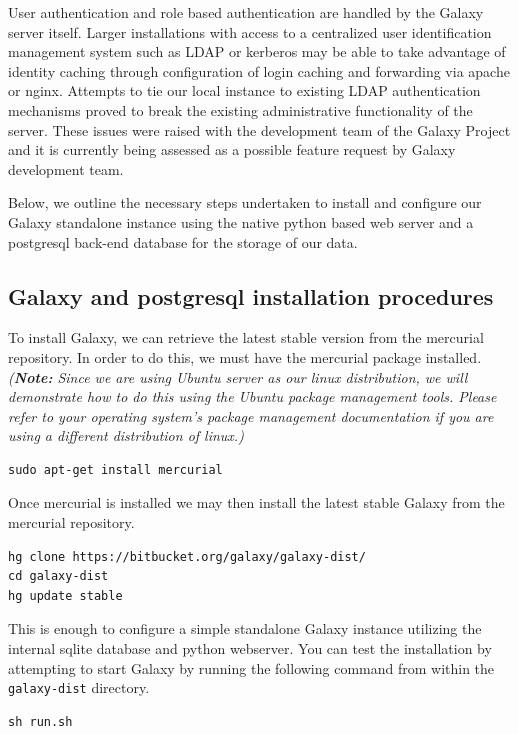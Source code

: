 \documentclass[a4paper,10pt]{article}
\begin{document}
User authentication and role based authentication are handled by the Galaxy server itself.  Larger installations with access to a centralized user identification management system such as LDAP or kerberos may be able to take advantage of identity caching through configuration of login caching and forwarding via apache or nginx.  Attempts to tie our local instance to existing LDAP authentication mechanisms proved to break the existing administrative functionality of the server.  These issues were raised with the development team of the Galaxy Project and it is currently being assessed as a possible feature request by Galaxy development team.

Below, we outline the necessary steps undertaken to install and configure our Galaxy standalone instance using the native python based web server and a postgresql back-end database for the storage of our data.
\subsection{Galaxy and postgresql installation procedures}
To install Galaxy, we can retrieve the latest stable version from the mercurial repository.  In order to do this, we must have the mercurial package installed.  \textit{(\textbf{Note:} Since we are using Ubuntu server as our linux distribution, we will demonstrate how to do this using the Ubuntu package management tools.  Please refer to your operating system's package management documentation if you are using a different distribution of linux.)}

\begin{lstlisting}
sudo apt-get install mercurial
\end{lstlisting}

Once mercurial is installed we may then install the latest stable Galaxy from the mercurial repository.

\begin{lstlisting}
hg clone https://bitbucket.org/galaxy/galaxy-dist/
cd galaxy-dist
hg update stable
\end{lstlisting}

This is enough to configure a simple standalone Galaxy instance utilizing the internal sqlite database and python webserver.  You can test the installation by attempting to start Galaxy by running the following command from within the \texttt{\footnotesize{galaxy-dist}} directory.

\begin{lstlisting}
sh run.sh
\end{lstlisting}
\end{document}
